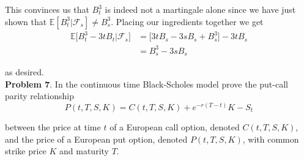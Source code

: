 \documentclass[12pt]{article}
\newlength\tindent
\renewcommand{\indent}{\hspace*{\tindent}}
\begin{document}
\indent This convinces us that $B_t^3$ is indeed not a martingale alone since we have just shown that $\mathbb E[B_t^3|\mathcal F_s] \neq B_s^3$. Placing our ingredients together we get
\begin{align*}
	\mathbb E\Big[B_t^3 - 3tB_t \big|\mathcal F_s\Big] &= \big[3tB_s- 3sB_s + B^3_s\big] - 3tB_s \\
	&= B^3_s - 3sB_s
\end{align*}

as desired. \\

{\bf Problem 7}. In the continuous time Black-Scholes model prove the put-call parity relationship
\begin{equation*}
	P(t,T,S,K) = C(t,T,S,K) + e^{-r(T-t)}K - S_t
\end{equation*}

between the price at time $t$ of a European call option, denoted $C(t,T,S,K)$, and the price of a European put option, denoted $P(t,T,S,K)$, with common strike price $K$ and maturity $T$. \\
\end{document}
